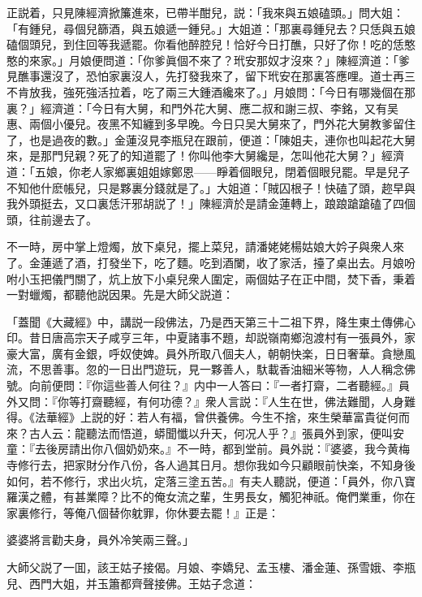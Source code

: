 正説着，只見陳經濟掀簾進來，已帶半酣兒，説：「我來與五娘磕頭。」問大姐：「有鍾兒，尋個兒篩酒，與五娘遞一鍾兒。」大姐道：「那裏尋鍾兒去？只恁與五娘磕個頭兒，到住回等我遞罷。你看他醉腔兒！恰好今日打醮，只好了你！吃的恁憨憨的來家。」月娘便問道：「你爹眞個不來了？玳安那奴才沒來？」陳經濟道：「爹見醮事還沒了，恐怕家裏沒人，先打發我來了，留下玳安在那裏答應哩。道士再三不肯放我，強死強活拉着，吃了兩三大鍾酒纔來了。」月娘問：「今日有哪幾個在那裏？」經濟道：「今日有大舅，和門外花大舅、應二叔和謝三叔、李銘，又有吴惠、兩個小優兒。夜黑不知纏到多早晚。今日只吴大舅來了，門外花大舅教爹留住了，也是過夜的數。」金蓮沒見李瓶兒在跟前，便道：「陳姐夫，連你也叫起花大舅來，是那門兒親？死了的知道罷了！你叫他李大舅纔是，怎叫他花大舅？」經濟道：「五娘，你老人家鄉裏姐姐嫁鄭恩——睜着個眼兒，閉着個眼兒罷。早是兒子不知他什麽帳兒，只是夥裏分錢就是了。」大姐道：「賊囚根子！快磕了頭，趂早與我外頭挺去，又口裏恁汗邪胡説了！」陳經濟於是請金蓮轉上，踉踉蹌蹌磕了四個頭，往前邊去了。

不一時，房中掌上燈燭，放下桌兒，擺上菜兒，請潘姥姥楊姑娘大妗子與衆人來了。金蓮遞了酒，打發坐下，吃了麵。吃到酒闌，收了家活，擡了桌出去。月娘吩咐小玉把儀門關了，炕上放下小桌兒衆人圍定，兩個姑子在正中間，焚下香，秉着一對蠟燭，都聽他説因果。先是大師父説道：

\begin{myquote}[\markfont]
「蓋聞《大藏經》中，講説一段佛法，乃是西天第三十二祖下界，降生東土傳佛心印。昔日唐高宗天子咸亨三年，中夏諸事不題，却説嶺南鄉泡渡村有一張員外，家豪大富，廣有金銀，呼奴使婢。員外所取八個夫人，朝朝快楽，日日奢華。貪戀風流，不思善事。忽的一日出門遊玩，見一夥善人，馱載香油細米等物，人人稱念佛號。向前便問：『你這些善人何往？』内中一人答曰：『一者打齋，二者聽經。』員外又問：『你等打齋聽經，有何功德？』衆人言説：『人生在世，佛法難聞，人身難得。《法華經》上説的好：若人有福，曾供養佛。今生不捨，來生榮華富貴従何而來？古人云：龍聽法而悟道，蟒聞懺以升天，何况人乎？』張員外到家，便叫安童：『去後房請出你八個奶奶來。』不一時，都到堂前。員外説：『婆婆，我今黄梅寺修行去，把家財分作八份，各人過其日月。想你我如今只顧眼前快楽，不知身後如何，若不修行，求出火坑，定落三塗五苦。』有夫人聽説，便道：「員外，你八寶羅漢之體，有甚業障？比不的俺女流之輩，生男長女，觸犯神祇。俺們業重，你在家裏修行，等俺八個替你躭罪，你休要去罷！』正是：

婆婆將言勸夫身，員外冷笑兩三聲。」
\end{myquote}

大師父説了一囬，該王姑子接偈。月娘、李嬌兒、孟玉樓、潘金蓮、孫雪娥、李瓶兒、西門大姐，并玉簫都齊聲接佛。王姑子念道：


